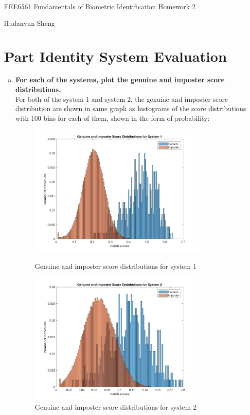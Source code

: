 \documentclass[a4paper]{article}
\begin{document}
\begin{spacing}{2.0}
\begin{flushleft}\begin{huge}EEE6561  Fundamentals of Biometric Identification   Homework 2\end{huge}
\end{flushleft}
\begin{flushright}\begin{Large}Hudanyun Sheng\end{Large}\end{flushright}
\section*{\huge\textbf{ Part \uppercase\expandafter{} Identity System Evaluation}  }
	\normalsize
	\begin{enumerate}[(a)]
		\item \textbf{For each of the systems, plot the genuine and imposter score distributions.}\\
		For both of the system 1 and system 2, the genuine and imposter score distribution are shown in 		same graph as histograms of the score distributions with 100 bins for each of them, shown in the 		form of probability:
		\begin{figure}[h]
		\begin{minipage}[t]{0.5\linewidth}
		\centering
		\includegraphics[width = 3.5in]{scoreDisSys1.jpg}
		\caption{Genuine and imposter score distributions for system 1}
		\end{minipage}
		\begin{minipage}[t]{0.5\linewidth}
		\centering
		\includegraphics[width = 3.5in]{scoreDisSys2.jpg}
		\caption{Genuine and imposter score distributions for system 2}		
		\end{minipage}
		\end{figure}
		

\end{enumerate}
\end{spacing}
\end{document}
